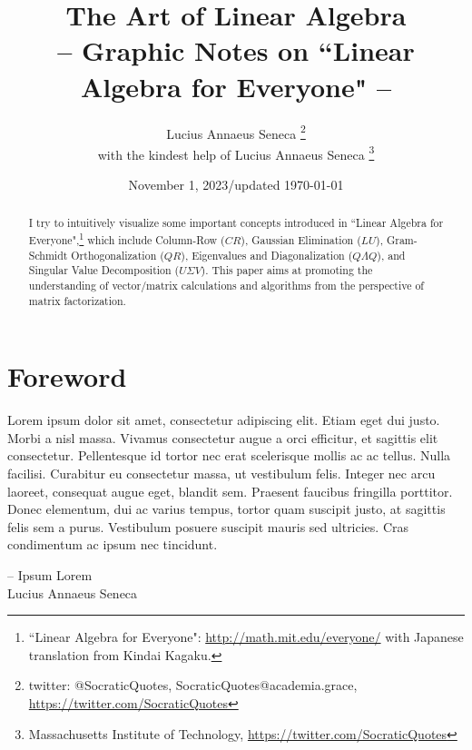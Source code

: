\documentclass{article}
\begin{document}
\title{The Art of Linear Algebra\\
    \vspace{5pt}
    \large{
    -- Graphic Notes on ``Linear Algebra for Everyone" --
    }
}

\author{Lucius Annaeus Seneca
    \thanks{twitter: @SocraticQuotes, SocraticQuotes@academia.grace, \url{https://twitter.com/SocraticQuotes}} \\
    with the kindest help of Lucius Annaeus Seneca
    \thanks{Massachusetts Institute of Technology, \url{https://twitter.com/SocraticQuotes}}
}

\date{November 1, 2023/updated \today}
\maketitle
\vspace{-5pt}

\begin{abstract}
I try to intuitively visualize some important concepts introduced
in ``Linear Algebra for Everyone",\footnote{``Linear Algebra for Everyone":
\url{http://math.mit.edu/everyone/} with Japanese translation from Kindai Kagaku.}
which include Column-Row ($CR$), Gaussian Elimination ($LU$),
Gram-Schmidt Orthogonalization ($QR$), Eigenvalues and Diagonalization ($Q \Lambda Q$),
and Singular Value Decomposition ($U \Sigma V$).
This paper aims at promoting the understanding of vector/matrix calculations
and algorithms from the perspective of matrix factorization.
\end{abstract}

\section*{Foreword}
Lorem ipsum dolor sit amet, consectetur adipiscing elit. Etiam eget dui justo. Morbi a nisl massa. Vivamus consectetur augue a orci efficitur, et sagittis elit consectetur. Pellentesque id tortor nec erat scelerisque mollis ac ac tellus. Nulla facilisi. Curabitur eu consectetur massa, ut vestibulum felis. Integer nec arcu laoreet, consequat augue eget, blandit sem. Praesent faucibus fringilla porttitor. Donec elementum, dui ac varius tempus, tortor quam suscipit justo, at sagittis felis sem a purus. Vestibulum posuere suscipit mauris sed ultricies. Cras condimentum ac ipsum nec tincidunt.

\begin{flushright}
-- Ipsum Lorem \\ Lucius Annaeus Seneca
\end{flushright}
\end{document}
